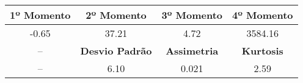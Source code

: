 \documentclass[8pt,a4paper,portuguese]{extarticle}
\begin{document}
\begin{table}[htbp]
\centering
\begin{tabular}{c|c|c|c}
\hline
\hline
\multicolumn{1}{c|}{\textbf{1º Momento}} & \textbf{2º Momento} & \textbf{3º Momento} & \textbf{4º Momento} \\ \hline
\multicolumn{1}{c|}{-0.65} & \multicolumn{1}{c|}{37.21} & \multicolumn{1}{c|}{4.72} & \multicolumn{1}{c}{3584.16} \\ \hline \hline
– & \textbf{Desvio Padrão} & \textbf{Assimetria} & \textbf{Kurtosis} \\ \hline
– & \multicolumn{1}{c|}{6.10} & \multicolumn{1}{c|}{0.021} & \multicolumn{1}{c}{2.59} \\ \hline \hline
\end{tabular}
\label{}
\end{table}
\end{document}
